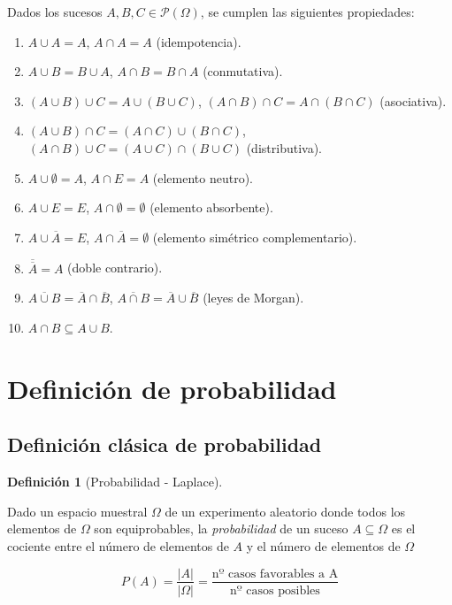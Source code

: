 \documentclass[
  a4paper,
]{scrreport}
\providecommand{\tightlist}{%
  \setlength{\itemsep}{0pt}\setlength{\parskip}{0pt}}\usepackage{longtable,booktabs,array}
\theoremstyle{plain}
\theoremstyle{definition}
\theoremstyle{definition}
\newtheorem{definition}{Definición}[chapter]
\theoremstyle{remark}
\begin{document}
Dados los sucesos \(A,B,C\in  \mathcal{P}(\Omega)\), se cumplen las
siguientes propiedades:

\begin{enumerate}
\def\labelenumi{\arabic{enumi}.}
\tightlist
\item
  \(A\cup A=A\), \(A\cap A=A\) (idempotencia).
\item
  \(A\cup B=B\cup A\), \(A\cap B = B\cap A\) (conmutativa).
\item
  \((A\cup B)\cup C = A\cup (B\cup C)\),
  \((A\cap B)\cap C = A\cap (B\cap C)\) (asociativa).
\item
  \((A\cup B)\cap C = (A\cap C)\cup (B\cap C)\),
  \((A\cap B)\cup C = (A\cup C)\cap (B\cup C)\) (distributiva).
\item
  \(A\cup \emptyset=A\), \(A\cap E=A\) (elemento neutro).
\item
  \(A\cup E=E\), \(A\cap \emptyset=\emptyset\) (elemento absorbente).
\item
  \(A\cup \overline A = E\), \(A\cap \overline A= \emptyset\) (elemento
  simétrico complementario).
\item
  \(\overline{\overline A} = A\) (doble contrario).
\item
  \(\overline{A\cup B} = \overline A\cap \overline B\),
  \(\overline{A\cap B} = \overline A\cup \overline B\) (leyes de
  Morgan).
\item
  \(A\cap B\subseteq A\cup B\).
\end{enumerate}

\section{Definición de
probabilidad}\label{definiciuxf3n-de-probabilidad}

\subsection{Definición clásica de
probabilidad}\label{definiciuxf3n-cluxe1sica-de-probabilidad}

\begin{definition}[Probabilidad -
Laplace]\protect\hypertarget{def-laplace}{}\label{def-laplace}

Dado un espacio muestral \(\Omega\) de un experimento aleatorio donde
todos los elementos de \(\Omega\) son equiprobables, la
\emph{probabilidad} de un suceso \(A\subseteq \Omega\) es el cociente
entre el número de elementos de \(A\) y el número de elementos de
\(\Omega\)

\[P(A) = \frac{|A|}{|\Omega|} = \frac{\mbox{nº casos favorables a A}}{\mbox{nº casos posibles}}\]

\end{definition}
\end{document}
